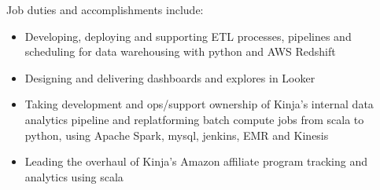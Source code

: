 \normalsize
Job duties and accomplishments include:
\small
\begin{itemize}
    \item Developing, deploying and supporting ETL processes, pipelines and scheduling for data warehousing with python and AWS Redshift
    \item Designing and delivering dashboards and explores in Looker
    \item Taking development and ops/support ownership of Kinja's internal data analytics pipeline and replatforming batch compute jobs from scala to python, using Apache Spark, mysql, jenkins, EMR and Kinesis
    \item Leading the overhaul of Kinja's Amazon affiliate program tracking and analytics using scala
\end{itemize}
\normalsize
\medskip
